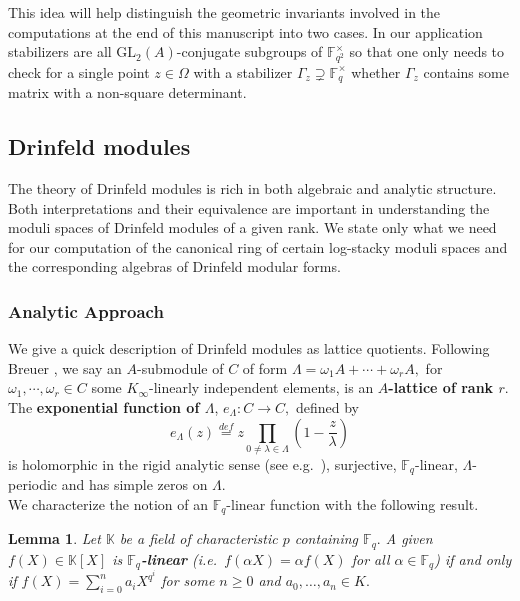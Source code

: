 \documentclass[11pt]{amsart}
\newtheorem{lemma}[theorem]{Lemma}
\theoremstyle{definition}
\numberwithin{equation}{section}
\newcommand{\GL}{\mathrm{GL}} 	%
\newcommand{\bbF}{\mathbb{F}}		%
\newcommand{\bbK}{\mathbb{K}}		%
\begin{document}
		This idea will help distinguish the geometric invariants involved in the computations at the end of this manuscript into two cases. In our application stabilizers are all $\GL_2(A)$-conjugate subgroups of $\bbF_{q^2}^{\times}$ so that one only needs to check for a single point $z\in \Omega$ with a stabilizer $\Gamma_z\supsetneq \bbF_q^{\times}$ whether $\Gamma_z$ contains some matrix with a non-square determinant.   
		
		\subsection{Drinfeld modules}
		
		The theory of Drinfeld modules is rich in both algebraic and analytic structure. Both interpretations and their equivalence are important in understanding the moduli spaces of Drinfeld modules of a given rank. We state only what we need for our computation of the canonical ring of certain log-stacky moduli spaces and the corresponding algebras of Drinfeld modular forms. 
		
		\subsubsection{Analytic Approach}
		
		We give a quick description of Drinfeld modules as lattice quotients. 
		Following Breuer \cite{Breuer-Gekeler-h-function}, we say an $A$-submodule of $C$ of form $\Lambda = \omega_1A+\cdots+\omega_rA,$ for $\omega_1,\cdots, \omega_r\in C$ some $K_{\infty}$-linearly independent elements, is an \textbf{$A$-lattice of rank $r.$} The \textbf{exponential function of $\Lambda$}, $e_{\Lambda}:C\to C,$ defined by
		\[e_{\Lambda}(z)\overset{def}{=}z\prod_{0\neq \lambda \in \Lambda}\left(1-\frac{z}{\lambda}\right) \] is holomorphic in the rigid analytic sense (see e.g.\ \cite[Definition $2.2.1$]{Frensel-vanderPut-Rigid-Analytic_Geom}), surjective, $\bbF_q$-linear, $\Lambda$-periodic and has simple zeros on $\Lambda.$\\
		
		We characterize the notion of an $\bbF_q$-linear function with the following result.
		\begin{lemma}
			Let $\bbK$ be a field of characteristic $p$ containing $\bbF_q.$ A given $f(X)\in \bbK[X]$ is \textbf{$\bbF_q$-linear} (i.e.\ $f(\alpha X)=\alpha f(X)$ for all $\alpha \in \bbF_q$) if and only if $\displaystyle{f(X)=\sum_{i=0}^n a_iX^{q^i}}$ for some $n\geq 0$ and $a_0,\ldots, a_n\in K.$
		\end{lemma}
		
\end{document}
